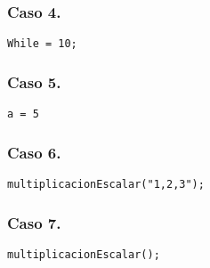 \subsubsection{Caso 4.}

\begin{verbatim}
While = 10;
\end{verbatim}

\subsubsection{Caso 5.}

\begin{verbatim}
a = 5
\end{verbatim}

\subsubsection{Caso 6.}

\begin{verbatim}
multiplicacionEscalar("1,2,3");
\end{verbatim}

\subsubsection{Caso 7.}

\begin{verbatim}
multiplicacionEscalar();
\end{verbatim}

